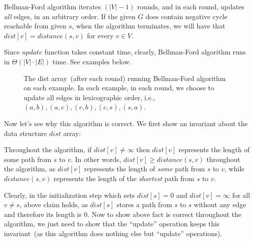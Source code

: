 Bellman-Ford algorithm iterates $(|V| - 1)$ rounds, and in each round, updates \emph{all} edges, in an arbitrary order.
If the given $G$ does contain negative cycle reachable from given $s$,
when the algorithm terminates, we will have that $dist[v] = distance(s,v)$ for every $v\in V$. 

\begin{minipage}{0.8\textwidth}
	\xxx
	\xxx
	\xxx
	\xxx
	\xxx
	\xxx
	\xxx
	\xxx
	\xxx
\end{minipage}

Since $update$ function takes constant time, clearly, Bellman-Ford algorithm runs in $\Theta(|V| \cdot |E|)$ time.
See examples below.

\begin{figure}[h]
\centering{}
\caption{The dist array~(after each round) running Bellman-Ford algorithm on each example.
In each example, in each round, we choose to update all edges in lexicographic order, i.e., $(a,b), (a,c), (c,b),(c,s),(s,a)$.}
\end{figure}


Now let's see why this algorithm is correct. We first show an invariant about the data structure $dist$ array: 

\begin{fact}
\label{fact1}
Throughout the algorithm, if $dist[v] \neq \infty$ then $dist[v]$ represents the length of some path from $s$ to $v$.
In other words, $dist[v] \ge distance(s,v)$ throughout the algorithm, as $dist[v]$ 
represents the length of \emph{some} path from $s$ to $v$, while $distance(s,v)$ represents the
length of the \emph{shortest} path from $s$ to $v$.
\end{fact}

Clearly, in the initialization step which sets $dist[s] = 0$ and $dist[v] = \infty$ for all $v\neq s$, above claim holds,
as $dist[s]$ stores a path from $s$ to $s$ without any edge and therefore its length is 0.
Now to show above fact is correct throughout the algorithm, we just need to show that the ``update'' operation keeps
this invariant~(as this algorithm does nothing else but ``update'' operations).


